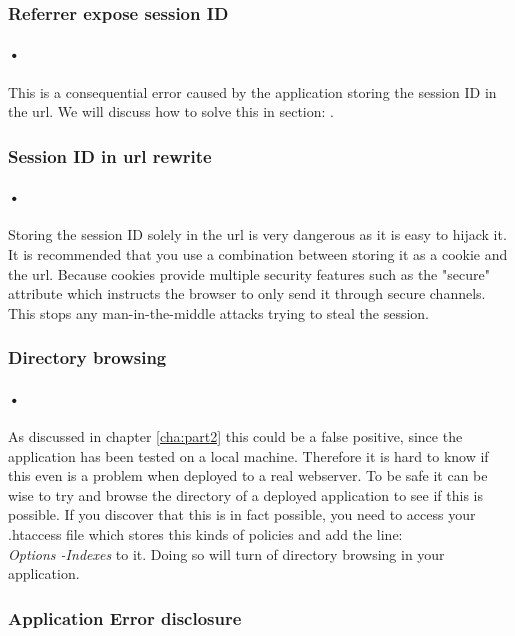 \documentclass[11pt,english,a4paper]{report}
\begin{document}
\subsubsection{Referrer expose session ID}
\paragraph{•}
This is a consequential error caused by the application storing the session ID in the \gls{url}.
We will discuss how to solve this in section: .

\subsubsection{Session ID in \gls{url} rewrite}
\label{subsec:sessionid}
\paragraph{•}
Storing the session ID solely in the \gls{url} is very dangerous as it is easy to hijack it.
It is recommended that you use a combination between storing it as a cookie and the \gls{url}.
Because cookies provide multiple security features such as the "secure" attribute which instructs the browser to only send it through secure channels.
This stops any man-in-the-middle attacks trying to steal the session.\cite{session-management}

\subsubsection{Directory browsing}
\paragraph{•}
As discussed in chapter \ref{cha:part2} this could be a false positive, since the application has been tested on a local machine.
Therefore it is hard to know if this even is a problem when deployed to a real webserver. 
To be safe it can be wise to try and browse the directory of a deployed application to see if this is possible.
If you discover that this is in fact possible, you need to access your .htaccess file which stores this kinds of policies and add the line:
\\
\textit{Options -Indexes} to it.
Doing so will turn of directory browsing in your application.

\subsubsection{Application Error disclosure}
\end{document}
